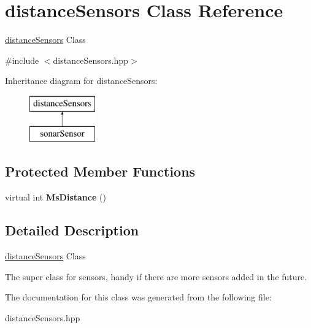 \hypertarget{classdistance_sensors}{}\section{distance\+Sensors Class Reference}
\label{classdistance_sensors}


\hyperlink{classdistance_sensors}{distance\+Sensors} Class  




{\ttfamily \#include $<$distance\+Sensors.\+hpp$>$}

Inheritance diagram for distance\+Sensors\+:\begin{figure}[H]
\begin{center}
\leavevmode
\includegraphics[height=2.000000cm]{classdistance_sensors}
\end{center}
\end{figure}
\subsection*{Protected Member Functions}
\begin{DoxyCompactItemize}
\item 
virtual int {\bfseries Ms\+Distance} ()\hypertarget{classdistance_sensors_a671c14e0869febbbcc4f428ee7bf0790}{}\label{classdistance_sensors_a671c14e0869febbbcc4f428ee7bf0790}

\end{DoxyCompactItemize}


\subsection{Detailed Description}
\hyperlink{classdistance_sensors}{distance\+Sensors} Class 

The super class for sensors, handy if there are more sensors added in the future. 

The documentation for this class was generated from the following file\+:\begin{DoxyCompactItemize}
\item 
distance\+Sensors.\+hpp\end{DoxyCompactItemize}
